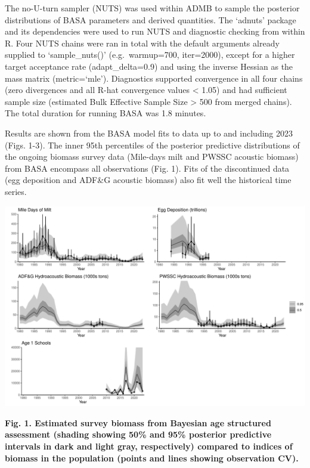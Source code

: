 \documentclass[
  11pt,
]{article}
\begin{document}
The no-U-turn sampler (NUTS) was used within ADMB to sample the
posterior distributions of BASA parameters and derived quantities. The
`adnuts' package and its dependencies were used to run NUTS and
diagnostic checking from within R. Four NUTS chains were ran in total
with the default arguments already supplied to `sample\_nuts()'
(e.g.~warmup=700, iter=2000), except for a higher target acceptance rate
(adapt\_delta=0.9) and using the inverse Hessian as the mass matrix
(metric=`mle'). Diagnostics supported convergence in all four chains
(zero divergences and all R-hat convergence values \textless{} 1.05) and
had sufficient sample size (estimated Bulk Effective Sample Size
\textgreater{} 500 from merged chains). The total duration for running
BASA was 1.8 minutes.

Results are shown from the BASA model fits to data up to and including
2023 (Figs. 1-3). The inner 95th percentiles of the posterior predictive
distributions of the ongoing biomass survey data (Mile-days milt and
PWSSC acoustic biomass) from BASA encompass all observations (Fig. 1).
Fits of the discontinued data (egg deposition and ADF\&G acoustic
biomass) also fit well the historical time series.

\begin{center}\includegraphics[width=0.85\linewidth]{figures/survey_fits} \end{center}

\textbf{Fig. 1. Estimated survey biomass from Bayesian age structured
assessment (shading showing 50\% and 95\% posterior predictive intervals
in dark and light gray, respectively) compared to indices of biomass in
the population (points and lines showing observation CV).}
\end{document}
